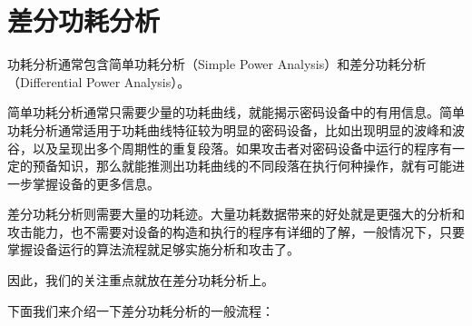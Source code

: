 \section{差分功耗分析} %
\label{sec:dpa}
功耗分析通常包含简单功耗分析（Simple Power Analysis）和差分功耗分析（Differential Power Analysis）。

简单功耗分析通常只需要少量的功耗曲线，就能揭示密码设备中的有用信息。简单功耗分析通常适用于功耗曲线特征较为明显的密码设备，比如出现明显的波峰和波谷，以及呈现出多个周期性的重复段落。如果攻击者对密码设备中运行的程序有一定的预备知识，那么就能推测出功耗曲线的不同段落在执行何种操作，就有可能进一步掌握设备的更多信息。

差分功耗分析则需要大量的功耗迹。大量功耗数据带来的好处就是更强大的分析和攻击能力，也不需要对设备的构造和执行的程序有详细的了解，一般情况下，只要掌握设备运行的算法流程就足够实施分析和攻击了。

因此，我们的关注重点就放在差分功耗分析上。

\vspace*{\baselineskip}

下面我们来介绍一下差分功耗分析的一般流程：\cite{paa_cn}

